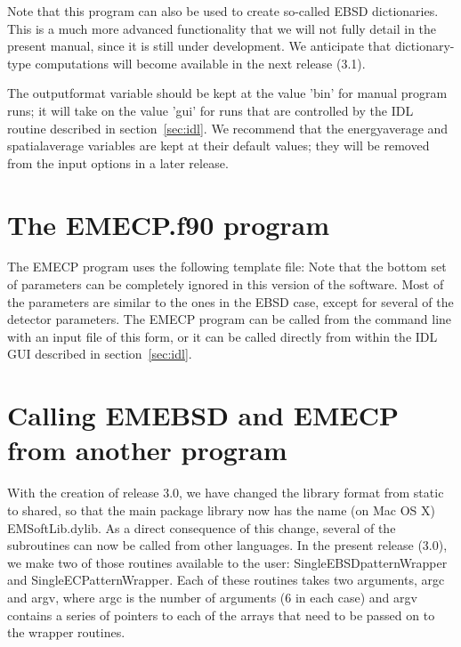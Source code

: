 \documentclass[DIV=calc, paper=letter, fontsize=11pt]{scrartcl}	 %
\begin{document}
Note that this program can also be used to create so-called EBSD dictionaries.  This is a much more advanced functionality 
that we will not fully detail in the present manual, since it is still under development.  We anticipate that dictionary-type 
computations will become available in the next release (3.1).

The \textsf{outputformat} variable should be kept at the value \textsf{'bin'} for manual program runs; it will take on 
the value \textsf{'gui'} for runs that are controlled by the IDL routine described in section~\ref{sec:idl}.  We recommend
that the \textsf{energyaverage} and \textsf{spatialaverage} variables are kept at their default values; they will be removed 
from the input options in a later release.

\section{The \protect\textsf{EMECP.f90} program\label{sec:f90ECP}}
The \textsf{EMECP} program uses the following template file:
Note that the bottom set of parameters can be completely ignored in this version of the software.  Most of the parameters 
are similar to the ones in the EBSD case, except for several of the detector parameters.  The \textsf{EMECP} program
can be called from the command line with an input file of this form, or it can be called directly from within the IDL GUI
described in section~\ref{sec:idl}.  

\section{Calling \textsf{EMEBSD} and \textsf{EMECP} from another program\label{sec:external}}
With the creation of release 3.0, we have changed the library format from static to shared, so that the main package
library now has the name (on Mac OS X) \textsf{EMSoftLib.dylib}.  As a direct consequence of this change, several of 
the subroutines can now be called from other languages.  In the present release (3.0), we make two of those routines
available to the user: \textsf{SingleEBSDpatternWrapper} and \textsf{SingleECPatternWrapper}. Each of these routines
takes two arguments, \textsf{argc} and \textsf{argv}, where \textsf{argc} is the number of arguments ($6$ in each case)
and \textsf{argv} contains a series of pointers to each of the arrays that need to be passed on to the wrapper routines.
\end{document}
